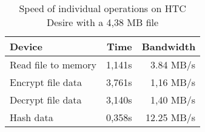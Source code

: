 \begin{table}
  \centering
  \caption{Speed of individual operations on HTC Desire with a 4,38 MB file}
  \begin{tabular}{ | l | r | r |}
    \hline
   \textbf{Device} & \textbf{Time} & \textbf{Bandwidth} \\ \hline
   Read file to memory  & 1,141s & 3.84 MB/s       \\ \hline
   Encrypt file data    & 3,761s & 1,16 MB/s    \\  \hline
   Decrypt file data    & 3,140s & 1,40 MB/s    \\ \hline
   Hash data            & 0,358s & 12.25 MB/s   \\ \hline
  \end{tabular}
  \label{tbl:desire:pinpoint}
\end{table}
